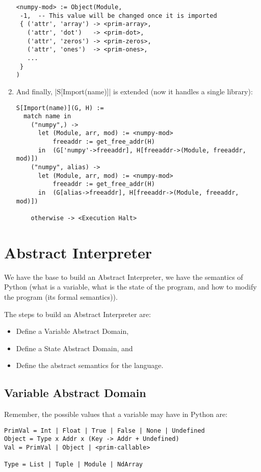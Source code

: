 \begin{enumerate}
\begin{verbatim}
<numpy-mod> := Object(Module,
 -1,  -- This value will be changed once it is imported
 { ('attr', 'array') -> <prim-array>,
   ('attr', 'dot')   -> <prim-dot>,
   ('attr', 'zeros') -> <prim-zeros>,
   ('attr', 'ones')  -> <prim-ones>,
   ...
 }
)
\end{verbatim}
\item
  And finally, \pycode|S[Import(name)]| is extended (now it handles
  a single library):

\begin{verbatim}
S[Import(name)](G, H) :=
  match name in
    ("numpy",) ->
      let (Module, arr, mod) := <numpy-mod>
          freeaddr := get_free_addr(H)
      in  (G['numpy'->freeaddr], H[freeaddr->(Module, freeaddr, mod)])
    ("numpy", alias) ->
      let (Module, arr, mod) := <numpy-mod>
          freeaddr := get_free_addr(H)
      in  (G[alias->freeaddr], H[freeaddr->(Module, freeaddr, mod)])

    otherwise -> <Execution Halt>
\end{verbatim}
\end{enumerate}

\section{Abstract Interpreter}\label{abstract-interpreter}

We have the base to build an Abstract Interpreter, we have the semantics
of Python (what is a variable, what is the state of the program, and how
to modify the program (its formal semantics)).

The steps to build an Abstract Interpreter are:

\begin{itemize}
\tightlist
\item
  Define a Variable Abstract Domain,
\item
  Define a State Abstract Domain, and
\item
  Define the abstract semantics for the language.
\end{itemize}

\subsection{Variable Abstract Domain}\label{variable-abstract-domain}

Remember, the possible values that a variable may have in Python are:

\begin{verbatim}
PrimVal = Int | Float | True | False | None | Undefined
Object = Type x Addr x (Key -> Addr + Undefined)
Val = PrimVal | Object | <prim-callable>

Type = List | Tuple | Module | NdArray
\end{verbatim}

